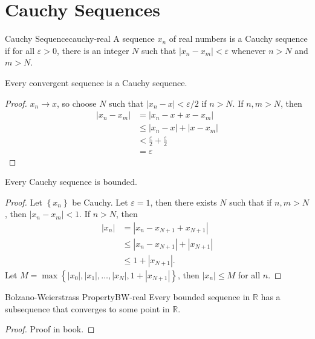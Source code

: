 \documentclass[10pt]{report}
\begin{document}
\section{Cauchy Sequences}

\begin{defn}{Cauchy Sequence}{cauchy-real}
	A sequence $x_n$ of real numbers is a Cauchy sequence if for all $\varepsilon>0$, there is an integer $N$ such that $|x_n-x_m|<\varepsilon$ whenever $n >N$ and $m>N$.
\end{defn}

\begin{prop}
	Every convergent sequence is a Cauchy sequence.
\end{prop}
\begin{proof}
	$x_n \to x$, so choose $N$ such that $|x_n-x| < \varepsilon/2$ if $n>N$. If $n,m >N$, then
	\begin{align*}
		|x_n-x_m| &= |x_n-x+x-x_m| \\
			  &\leq |x_n - x| + |x-x_m| \\
			  &< \frac{\varepsilon}{2} + \frac{\varepsilon}{2} \\
			  &= \varepsilon
	\end{align*}
\end{proof}

\begin{prop}
	Every Cauchy sequence is bounded.
\end{prop}
\begin{proof}
	Let $\left\{ x_n \right\}$ be Cauchy. Let $\varepsilon=1$, then there exists $N$ such that if $n,m > N$, then $|x_n - x_m| < 1$. If $n > N$, then 
	\begin{align*}
		|x_n| &= |x_n - x_{N+1}+x_{N+1}| \\
		      &\leq |x_n - x_{N+1}| + |x_{N+1}| \\
		      &\leq 1 + |x_{N+1}|.
	\end{align*}
	Let $M = \max\left\{ |x_0|,|x_1|,\dots,|x_N|,1 + |x_{N+1}| \right\}$, then $|x_n| \leq M$ for all $n$.
\end{proof}


\begin{thrm}{Bolzano-Weierstrass Property}{BW-real}
	Every bounded sequence in $\mathbb{R}$ has a subsequence that converges to some point in $\mathbb{R}$.
\end{thrm}
\begin{proof}
	{\color{red}Proof in book.} 
\end{proof}
\end{document}
